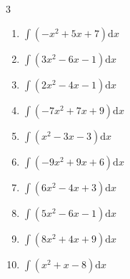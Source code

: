 \begin{multicols}{3}
\begin{enumerate}

\columnbreak %

\resetques

  \item $\displaystyle \int \left( -x^{2}+5x+7 \right) \mathrm{d}x$


  \item $\displaystyle \int \left( 3x^{2}-6x-1 \right) \mathrm{d}x$


  \item $\displaystyle \int \left( 2x^{2}-4x-1 \right) \mathrm{d}x$


  \item $\displaystyle \int \left( -7x^{2}+7x+9 \right) \mathrm{d}x$


  \item $\displaystyle \int \left( x^{2}-3x-3 \right) \mathrm{d}x$


  \item $\displaystyle \int \left( -9x^{2}+9x+6 \right) \mathrm{d}x$


  \item $\displaystyle \int \left( 6x^{2}-4x+3 \right) \mathrm{d}x$


  \item $\displaystyle \int \left( 5x^{2}-6x-1 \right) \mathrm{d}x$


  \item $\displaystyle \int \left( 8x^{2}+4x+9 \right) \mathrm{d}x$


  \item $\displaystyle \int \left( x^{2}+x-8 \right) \mathrm{d}x$


\end{enumerate}
\end{multicols}
